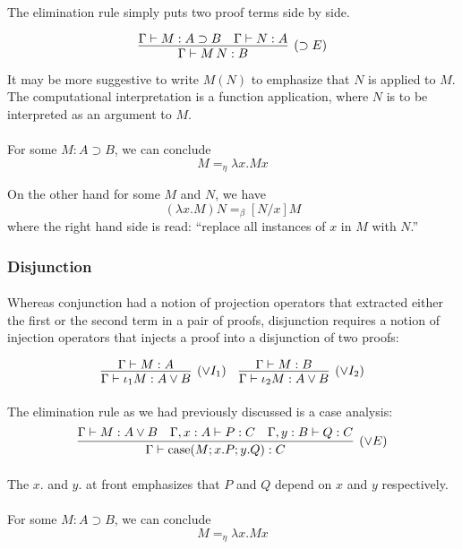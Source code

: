 \documentclass[a4paper]{article}
\begin{document}
\paragraph{}
The elimination rule simply puts two proof terms side by side.

$$\infer[(\supset E)]{\Gamma \vdash M\,N : B}{\Gamma \vdash M : A \supset B &
\Gamma \vdash N : A}$$

It may be more suggestive to write $M(N)$ to emphasize that $N$ is applied to
$M$. The computational interpretation is a function application, where $N$ is to
be interpreted as an argument to $M$.

\paragraph{}
For some $M  : A \supset B$, we can conclude
$$M =_{\eta} \lambda x. M x$$

On the other hand for some $M$ and $N$, we have
$$(\lambda x. M) N =_{\beta} [N/x]M$$
where the right hand side is read: ``replace all instances of $x$ in $M$ with
$N$.''

\subsubsection{Disjunction}
\paragraph{}
Whereas conjunction had a notion of projection operators that extracted either
the first or the second term in a pair of proofs, disjunction requires a notion
of injection operators that injects a proof into a disjunction of two proofs:

\[
  \infer[(\lor I_1)]{\Gamma \vdash \iota_1 M : A \lor B}{\Gamma \vdash M : A} \quad
  \infer[(\lor I_2)]{\Gamma \vdash \iota_2 M : A \lor B}{\Gamma \vdash M : B}
\]

\paragraph{}
The elimination rule as we had previously discussed is a case analysis:
$$\infer[(\lor E)]{\Gamma \vdash \text{case}(M; x.P; y.Q) : C}{\Gamma \vdash M : A
\lor B & \Gamma, x : A \vdash P : C & \Gamma, y : B \vdash Q : C}$$

\paragraph{}
The $x.$ and $y.$ at front emphasizes that $P$ and $Q$ depend on $x$ and $y$
respectively.

\paragraph{}
For some $M  : A \supset B$, we can conclude
$$M =_{\eta} \lambda x. M x$$
\end{document}
